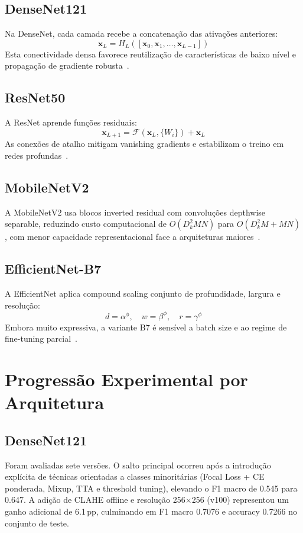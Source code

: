 \documentclass[runningheads]{llncs}
\begin{document}
\subsection{DenseNet121}
Na DenseNet, cada camada recebe a concatenação das ativações anteriores:
\begin{equation}
\mathbf{x}_L = H_L([\mathbf{x}_0, \mathbf{x}_1, \ldots, \mathbf{x}_{L-1}])
\end{equation}
Esta conectividade densa favorece reutilização de características de baixo
nível e propagação de gradiente robusta~\cite{huang2017}.

\subsection{ResNet50}
A ResNet aprende funções residuais:
\begin{equation}
\mathbf{x}_{L+1} = \mathcal{F}(\mathbf{x}_L, \{W_i\}) + \mathbf{x}_L
\end{equation}
As conexões de atalho mitigam vanishing gradients e estabilizam o treino em
redes profundas~\cite{he2016}.

\subsection{MobileNetV2}
A MobileNetV2 usa blocos inverted residual com convoluções depthwise separable,
reduzindo custo computacional de
\(O(D_k^2MN)\) para \(O(D_k^2M + MN)\), com menor capacidade representacional
face a arquiteturas maiores~\cite{sandler2018}.

\subsection{EfficientNet-B7}
A EfficientNet aplica compound scaling conjunto de profundidade, largura e
resolução:
\begin{equation}
d = \alpha^{\phi}, \quad w = \beta^{\phi}, \quad r = \gamma^{\phi}
\end{equation}
Embora muito expressiva, a variante B7 é sensível a batch size e ao regime de
fine-tuning parcial~\cite{tan2019}.

\section{Progressão Experimental por Arquitetura}

\subsection{DenseNet121}
Foram avaliadas sete versões. O salto principal ocorreu após a introdução
explícita de técnicas orientadas a classes minoritárias
(Focal Loss + CE ponderada, Mixup, TTA e threshold tuning), elevando o F1 macro
de 0.545 para 0.647. A adição de CLAHE offline e resolução 256\(\times\)256
(v100) representou um ganho adicional de 6.1\,pp, culminando em
F1 macro 0.7076 e accuracy 0.7266 no conjunto de teste.
\end{document}
